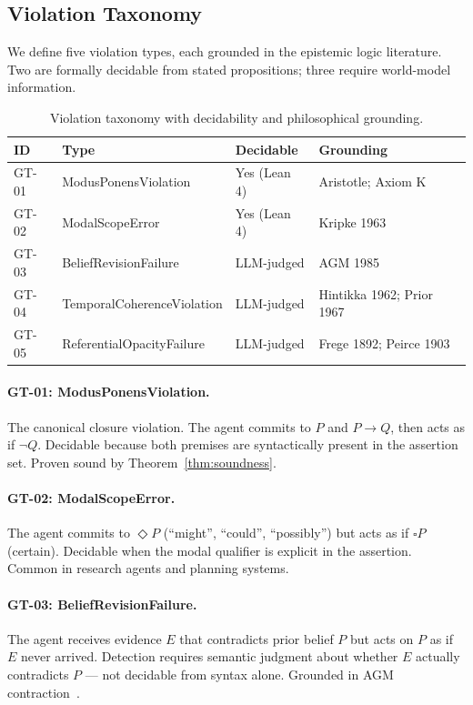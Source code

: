 \documentclass[11pt]{article}
\newcommand{\boxop}{\square}      %
\newcommand{\diaop}{\Diamond}     %
\begin{document}
\subsection{Violation Taxonomy}
\label{sec:taxonomy}

We define five violation types, each grounded in the epistemic logic
literature. Two are formally decidable from stated propositions; three
require world-model information.

\begin{table}[h]
\centering
\caption{Violation taxonomy with decidability and philosophical grounding.}
\label{tab:taxonomy}
\small
\begin{tabular}{@{}llll@{}}
\toprule
\textbf{ID} & \textbf{Type} & \textbf{Decidable} & \textbf{Grounding} \\
\midrule
GT-01 & ModusPonensViolation & \textcolor{formal}{Yes (Lean 4)} & Aristotle; Axiom K \\
GT-02 & ModalScopeError & \textcolor{formal}{Yes (Lean 4)} & Kripke 1963 \\
GT-03 & BeliefRevisionFailure & \textcolor{warning}{LLM-judged} & AGM 1985 \\
GT-04 & TemporalCoherenceViolation & \textcolor{warning}{LLM-judged} & Hintikka 1962; Prior 1967 \\
GT-05 & ReferentialOpacityFailure & \textcolor{warning}{LLM-judged} & Frege 1892; Peirce 1903 \\
\bottomrule
\end{tabular}
\end{table}

\paragraph{GT-01: ModusPonensViolation.}
The canonical closure violation. The agent commits to $P$ and $P \to Q$,
then acts as if $\neg Q$. Decidable because both premises are syntactically
present in the assertion set. Proven sound by Theorem~\ref{thm:soundness}.

\paragraph{GT-02: ModalScopeError.}
The agent commits to $\diaop P$ (``might'', ``could'', ``possibly'') but acts
as if $\boxop P$ (certain). Decidable when the modal qualifier is explicit
in the assertion. Common in research agents and planning systems.

\paragraph{GT-03: BeliefRevisionFailure.}
The agent receives evidence $E$ that contradicts prior belief $P$ but acts
on $P$ as if $E$ never arrived. Detection requires semantic judgment about
whether $E$ actually contradicts $P$ — not decidable from syntax alone.
Grounded in AGM contraction~\citep{agm1985}.
\end{document}
